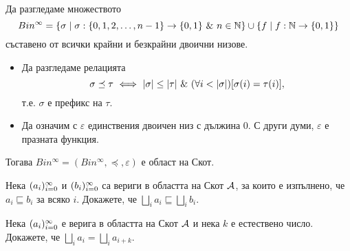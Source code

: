 \begin{example}
  Да разгледаме множеството 
  \[Bin^\infty = \{\sigma \mid \sigma :\{0,1,2,\dots,n-1\} \to \{0,1\}\ \&\ n \in \mathbb{N}\} \cup 
  \{f \mid f:\mathbb{N} \to \{0,1\}\}\]
  съставено от всички крайни и безкрайни двоични низове.
  \begin{itemize}
  \item
    Да разгледаме релацията
    \[\sigma \preceq \tau \ \Longleftrightarrow\  \vert{\sigma}\vert \leq \vert{\tau}\vert\ \&\ (\forall i < |\sigma|)[\sigma(i) = \tau(i)],\]
    т.е. $\sigma$ е префикс на $\tau$.    
  \item
    Да означим с $\varepsilon$ единствения двоичен низ с дължина $0$. С други думи, $\varepsilon$ е празната функция.
  \end{itemize}
  Тогава $Bin^\infty = (Bin^\infty,\preceq,\varepsilon)$ е област на Скот.
\end{example}

\begin{problem}
  Нека $(a_{i})^{\infty}_{i=0}$ и $(b_{i})^{\infty}_{i=0}$ са вериги в областта на Скот $\mathcal{A}$, за които е изпълнено, че
  $a_i \sqsubseteq b_i$ за всяко $i$.
  Докажете, че $\bigsqcup_i a_i \sqsubseteq \bigsqcup_i b_i$.
\end{problem}

\begin{problem}
  Нека $(a_{i})^{\infty}_{i=0}$ е верига в областта на Скот $\mathcal{A}$ и нека $k$ е естествено число.
  Докажете, че $\bigsqcup_i a_i = \bigsqcup_i a_{i+k}$.
\end{problem}



